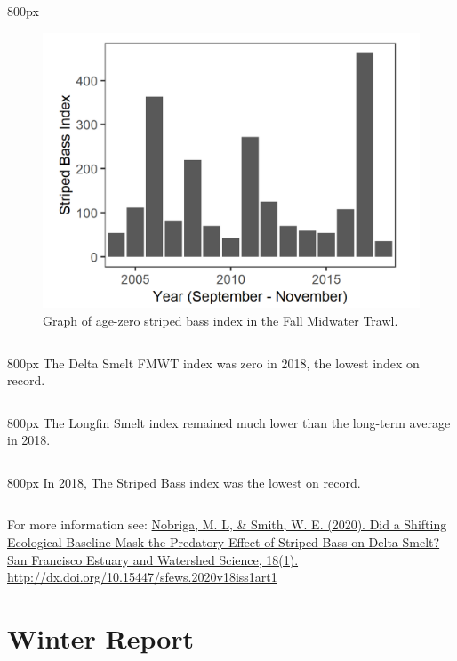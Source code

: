 \documentclass[
]{book}
\begin{document}
\begin{column}{800px\textwidth}
\begin{figure}
\includegraphics[width=15.25in]{figures/FMWT_SB0_2004} \caption{Graph of age-zero striped bass index in the Fall Midwater Trawl.}\label{fig:unnamed-chunk-141}
\end{figure}
\end{column}

\begin{column}{800px\textwidth}
The Delta Smelt FMWT index was zero in 2018, the lowest index on record.
\end{column}

\begin{column}{800px\textwidth}
The Longfin Smelt index remained much lower than the long-term average in 2018.
\end{column}

\begin{column}{800px\textwidth}
In 2018, The Striped Bass index was the lowest on record.
\end{column}

\begin{disclaimer}
For more information see:
\href{http://dx.doi.org/10.15447/sfews.2020v18iss1art1}{Nobriga, M. L,
\& Smith, W. E. (2020). Did a Shifting Ecological Baseline Mask the
Predatory Effect of Striped Bass on Delta Smelt? San Francisco Estuary
and Watershed Science, 18(1).}
\url{http://dx.doi.org/10.15447/sfews.2020v18iss1art1}
\end{disclaimer}

\hypertarget{Winter}{%
\chapter{Winter Report}\label{Winter}}
\end{document}
